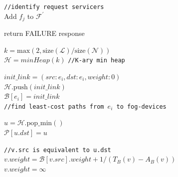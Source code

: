 \begin{algorithm}[!ht]
\BlankLine
\texttt{//identify request servicers} \\
{
    \label{raa:createRequestServicers}
    {
        Add $f_{j}$ to $\mathcal{F}^{\prime}$ \\ 
    }
}



{
    return FAILURE response \label{raa:failureResponse1}
}

\BlankLine
\label{raa_set_of_nodes}
$k = \mathrm{max}(2, \mathrm{size}(\mathcal{L})/\mathrm{size}(\mathcal{N}))$ \\
$\mathcal{H} = minHeap(k)$ \texttt{//K-ary min heap}\\
\BlankLine

\label{raa:dummy_edge}
$init\_link = (src: e_{i}, dst: e_{i}, weight: 0)$ \\
$\mathcal{H}.\mathrm{push}(init\_link)$ \\
$\mathcal{B}[e_{i}] = init\_link$ \\

\BlankLine
\texttt{//find least-cost paths from $e_{i}$ to fog-devices} \\
{
    $u = \mathcal{H}.\mathrm{pop\_min()}$\\
    
     {
        $\mathcal{P}[u.dst] = u$ \label{RAAshortestpathadd}
    }
    \BlankLine
    
    {
        \texttt{//v.src is equivalent to u.dst}\\
        $v.weight = \mathcal{B}[v.src].weight + 1/(T_{B}(v) - A_{B}(v))$ \label{RAAweight} \\
         {$v.weight = \infty$}
        
}}
\end{algorithm}

